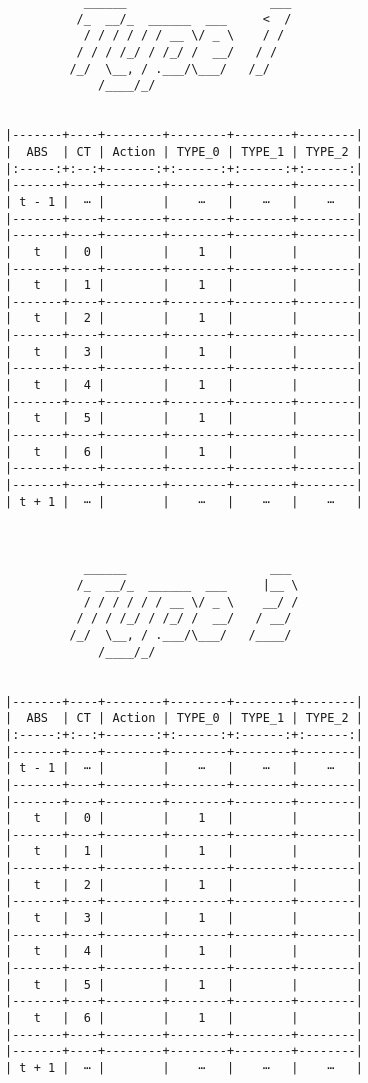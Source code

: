 \documentclass[varwidth=\maxdimen,margin=0.5cm,multi={verbatim}]{standalone}
\begin{document}
\begin{verbatim}
           ______                    ___
          /_  __/_  ______  ___     <  /
           / / / / / / __ \/ _ \    / / 
          / / / /_/ / /_/ /  __/   / /  
         /_/  \__, / .___/\___/   /_/   
             /____/_/


|-------+----+--------+--------+--------+--------|
|  ABS  | CT | Action | TYPE_0 | TYPE_1 | TYPE_2 |
|:-----:+:--:+-------:+:------:+:------:+:------:|
|-------+----+--------+--------+--------+--------|
| t - 1 |  ⋯ |        |    ⋯   |    ⋯   |    ⋯   |
|-------+----+--------+--------+--------+--------|
|-------+----+--------+--------+--------+--------|
|   t   |  0 |        |    1   |        |        |
|-------+----+--------+--------+--------+--------|
|   t   |  1 |        |    1   |        |        |
|-------+----+--------+--------+--------+--------|
|   t   |  2 |        |    1   |        |        |
|-------+----+--------+--------+--------+--------|
|   t   |  3 |        |    1   |        |        |
|-------+----+--------+--------+--------+--------|
|   t   |  4 |        |    1   |        |        |
|-------+----+--------+--------+--------+--------|
|   t   |  5 |        |    1   |        |        |
|-------+----+--------+--------+--------+--------|
|   t   |  6 |        |    1   |        |        |
|-------+----+--------+--------+--------+--------|
|-------+----+--------+--------+--------+--------|
| t + 1 |  ⋯ |        |    ⋯   |    ⋯   |    ⋯   |



           ______                    ___ 
          /_  __/_  ______  ___     |__ \
           / / / / / / __ \/ _ \    __/ /
          / / / /_/ / /_/ /  __/   / __/ 
         /_/  \__, / .___/\___/   /____/ 
             /____/_/


|-------+----+--------+--------+--------+--------|
|  ABS  | CT | Action | TYPE_0 | TYPE_1 | TYPE_2 |
|:-----:+:--:+-------:+:------:+:------:+:------:|
|-------+----+--------+--------+--------+--------|
| t - 1 |  ⋯ |        |    ⋯   |    ⋯   |    ⋯   |
|-------+----+--------+--------+--------+--------|
|-------+----+--------+--------+--------+--------|
|   t   |  0 |        |    1   |        |        |
|-------+----+--------+--------+--------+--------|
|   t   |  1 |        |    1   |        |        |
|-------+----+--------+--------+--------+--------|
|   t   |  2 |        |    1   |        |        |
|-------+----+--------+--------+--------+--------|
|   t   |  3 |        |    1   |        |        |
|-------+----+--------+--------+--------+--------|
|   t   |  4 |        |    1   |        |        |
|-------+----+--------+--------+--------+--------|
|   t   |  5 |        |    1   |        |        |
|-------+----+--------+--------+--------+--------|
|   t   |  6 |        |    1   |        |        |
|-------+----+--------+--------+--------+--------|
|-------+----+--------+--------+--------+--------|
| t + 1 |  ⋯ |        |    ⋯   |    ⋯   |    ⋯   |

\end{verbatim}
\end{document}
